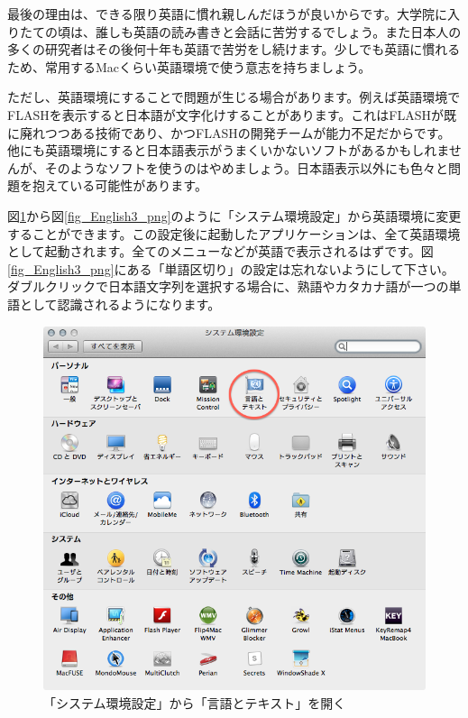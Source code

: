 最後の理由は、できる限り英語に慣れ親しんだほうが良いからです。大学院に入りたての頃は、誰しも英語の読み書きと会話に苦労するでしょう。また日本人の多くの研究者はその後何十年も英語で苦労をし続けます。少しでも英語に慣れるため、常用するMacくらい英語環境で使う意志を持ちましょう。

ただし、英語環境にすることで問題が生じる場合があります。例えば英語環境でFLASHを表示すると日本語が文字化けすることがあります。これはFLASHが既に廃れつつある技術であり、かつFLASHの開発チームが能力不足だからです。他にも英語環境にすると日本語表示がうまくいかないソフトがあるかもしれませんが、そのようなソフトを使うのはやめましょう。日本語表示以外にも色々と問題を抱えている可能性があります。

図\ref{fig_English1_png}から図\ref{fig_English3_png}のように「システム環境設定」から英語環境に変更することができます。この設定後に起動したアプリケーションは、全て英語環境として起動されます。全てのメニューなどが英語で表示されるはずです。図\ref{fig_English3_png}にある「単語区切り」の設定は忘れないようにして下さい。ダブルクリックで日本語文字列を選択する場合に、熟語やカタカナ語が一つの単語として認識されるようになります。

\begin{figure}
  \begin{center}
    \includegraphics[scale=0.4,bb= 0 0 668 636]{fig/English1.png}
    \caption{「システム環境設定」から「言語とテキスト」を開く}
    \label{fig_English1_png}
  \end{center}
\end{figure}

